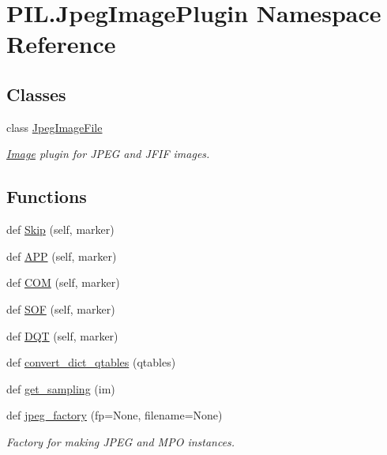\hypertarget{namespacePIL_1_1JpegImagePlugin}{}\section{P\+I\+L.\+Jpeg\+Image\+Plugin Namespace Reference}
\label{namespacePIL_1_1JpegImagePlugin}
\subsection*{Classes}
\begin{DoxyCompactItemize}
\item 
class \hyperlink{classPIL_1_1JpegImagePlugin_1_1JpegImageFile}{Jpeg\+Image\+File}
\begin{DoxyCompactList}\small\item\em \hyperlink{namespacePIL_1_1Image}{Image} plugin for J\+P\+EG and J\+F\+IF images. \end{DoxyCompactList}\end{DoxyCompactItemize}
\subsection*{Functions}
\begin{DoxyCompactItemize}
\item 
def \hyperlink{namespacePIL_1_1JpegImagePlugin_a04f3285204bf0d82a32c85a8d98eff12}{Skip} (self, marker)
\item 
def \hyperlink{namespacePIL_1_1JpegImagePlugin_aeec4e557e29bafb45ed9141f44ee9ce2}{A\+PP} (self, marker)
\item 
def \hyperlink{namespacePIL_1_1JpegImagePlugin_a8753b7fc9fa965f81cebce9b0eee232e}{C\+OM} (self, marker)
\item 
def \hyperlink{namespacePIL_1_1JpegImagePlugin_a057a766bac773d8441b21e7ad7ed7d00}{S\+OF} (self, marker)
\item 
def \hyperlink{namespacePIL_1_1JpegImagePlugin_adc7e2befe18c6f1da669d26f0185dc1f}{D\+QT} (self, marker)
\item 
def \hyperlink{namespacePIL_1_1JpegImagePlugin_add3a1c7e56a7e51a5c90b7a17ed42006}{convert\+\_\+dict\+\_\+qtables} (qtables)
\item 
def \hyperlink{namespacePIL_1_1JpegImagePlugin_ac42ed46247b1ddf5d26e6703ff0b4993}{get\+\_\+sampling} (im)
\item 
def \hyperlink{namespacePIL_1_1JpegImagePlugin_ace225623667a31a50089f8606252d7e5}{jpeg\+\_\+factory} (fp=None, filename=None)
\begin{DoxyCompactList}\small\item\em Factory for making J\+P\+EG and M\+PO instances. \end{DoxyCompactList}\end{DoxyCompactItemize}
